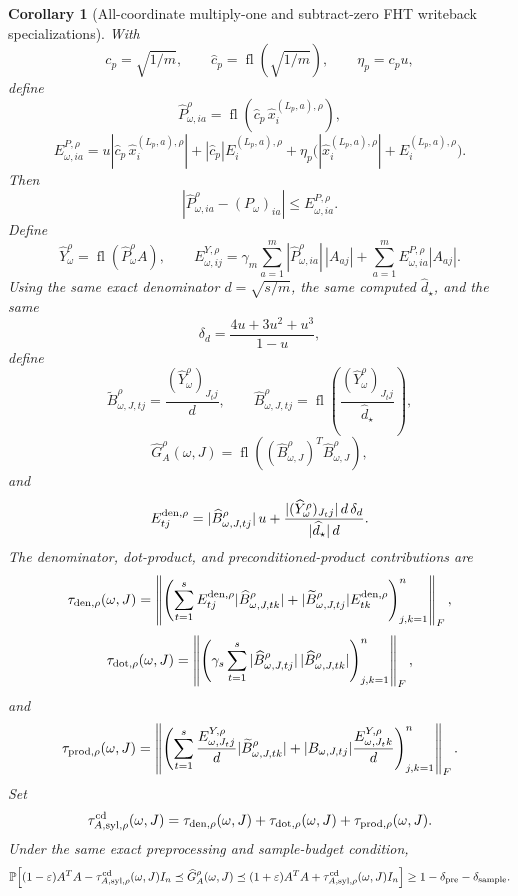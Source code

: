 \documentclass[11pt]{article}
\newcommand{\Prob}{\mathbb{P}}
\newcommand{\fl}{\operatorname{fl}}
\newcommand{\I}{I}
\newcommand{\eps}{\varepsilon}
\newtheorem{corollary}[theorem]{Corollary}
\theoremstyle{remark}
\begin{document}
\begin{corollary}[All-coordinate multiply-one and subtract-zero FHT writeback specializations]
With
\[
  c_p=\sqrt{1/m},\qquad
  \widehat c_p=\fl(\sqrt{1/m}),\qquad
  \eta_p=c_pu,
\]
define
\[
  \widehat P^\rho_{\omega,ia}
  =
  \fl\!\left(\widehat c_p\,\widehat x_i^{(L_p,a),\rho}\right),
\]
\[
  E^{P,\rho}_{\omega,ia}
  =
  u|\widehat c_p\,\widehat x_i^{(L_p,a),\rho}|
  +
  |\widehat c_p|E_i^{(L_p,a),\rho}
  +
  \eta_p\bigl(|\widehat x_i^{(L_p,a),\rho}|
      +E_i^{(L_p,a),\rho}\bigr).
\]
Then
\[
  |\widehat P^\rho_{\omega,ia}-(P_\omega)_{ia}|
  \le E^{P,\rho}_{\omega,ia}.
\]
Define
\[
  \widehat Y^\rho_\omega=\fl(\widehat P^\rho_\omega A),
  \qquad
  E^{Y,\rho}_{\omega,ij}
  =
  \gamma_m\sum_{a=1}^m
    |\widehat P^\rho_{\omega,ia}|\,|A_{aj}|
  +
  \sum_{a=1}^m E^{P,\rho}_{\omega,ia}|A_{aj}|.
\]
Using the same exact denominator \(d=\sqrt{s/m}\), the same computed
\(\widehat d_\star\), and the same
\[
  \delta_d=\frac{4u+3u^2+u^3}{1-u},
\]
define
\[
  \widetilde B^\rho_{\omega,J,tj}
    =
    \frac{(\widehat Y^\rho_\omega)_{J_tj}}{d},
  \qquad
  \widehat B^\rho_{\omega,J,tj}
    =
    \fl\!\left(
      \frac{(\widehat Y^\rho_\omega)_{J_tj}}{\widehat d_\star}
    \right),
\]
\[
  \widehat G_A^\rho(\omega,J)
  =
  \fl\!\left((\widehat B^\rho_{\omega,J})^T
             \widehat B^\rho_{\omega,J}\right),
\]
and
\[
  E^{{\rm den},\rho}_{tj}
  =
  |\widehat B^\rho_{\omega,J,tj}|\,u
  +
  \frac{|(\widehat Y^\rho_\omega)_{J_tj}|\,d\,\delta_d}
       {|\widehat d_\star|\,d}.
\]
The denominator, dot-product, and preconditioned-product contributions are
\[
  \tau_{{\rm den},\rho}(\omega,J)
  =
  \left\|
    \left(
      \sum_{t=1}^s
      E^{{\rm den},\rho}_{tj}
        |\widehat B^\rho_{\omega,J,tk}|
      +
      |\widetilde B^\rho_{\omega,J,tj}|
        E^{{\rm den},\rho}_{tk}
    \right)_{j,k=1}^n
  \right\|_F,
\]
\[
  \tau_{{\rm dot},\rho}(\omega,J)
  =
  \left\|
    \left(
      \gamma_s\sum_{t=1}^s
      |\widehat B^\rho_{\omega,J,tj}|\,
      |\widehat B^\rho_{\omega,J,tk}|
    \right)_{j,k=1}^n
  \right\|_F,
\]
and
\[
  \tau_{{\rm prod},\rho}(\omega,J)
  =
  \left\|
    \left(
      \sum_{t=1}^s
      \frac{E^{Y,\rho}_{\omega,J_tj}}{d}
        |\widetilde B^\rho_{\omega,J,tk}|
      +
      |B_{\omega,J,tj}|
      \frac{E^{Y,\rho}_{\omega,J_tk}}{d}
    \right)_{j,k=1}^n
  \right\|_F .
\]
Set
\[
  \tau_{A,{\rm syl},\rho}^{\rm cd}(\omega,J)
  =
  \tau_{{\rm den},\rho}(\omega,J)
  +
  \tau_{{\rm dot},\rho}(\omega,J)
  +
  \tau_{{\rm prod},\rho}(\omega,J).
\]
Under the same exact preprocessing and sample-budget condition,
\[
  \Prob\!\left[
    (1-\eps)A^TA-\tau_{A,{\rm syl},\rho}^{\rm cd}(\omega,J)\I_n
    \preceq
    \widehat G_A^\rho(\omega,J)
    \preceq
    (1+\eps)A^TA+\tau_{A,{\rm syl},\rho}^{\rm cd}(\omega,J)\I_n
  \right]
  \ge
  1-\delta_{\rm pre}-\delta_{\rm sample}.
\]


\end{corollary}
\end{document}
